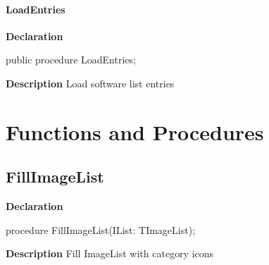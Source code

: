 \documentclass{report}
\newif\ifpdf
\begin{document}
\paragraph*{LoadEntries}\hspace*{\fill}

\label{manager.TMnFrm-LoadEntries}
\begin{list}{}{
\setlength{\itemindent}{0cm}
\setlength{\listparindent}{0cm}
\setlength{\leftmargin}{\evensidemargin}
\addtolength{\leftmargin}{\tmplength}
\settowidth{\labelsep}{X}
\addtolength{\leftmargin}{\labelsep}
\setlength{\labelwidth}{\tmplength}
}
\item[\textbf{Declaration}\hfill]
\ifpdf
\begin{flushleft}
\fi
\begin{ttfamily}
public procedure LoadEntries;\end{ttfamily}

\ifpdf
\end{flushleft}
\fi

\par
\item[\textbf{Description}]
Load software list entries

\end{list}
\section{Functions and Procedures}
\ifpdf
\subsection*{\large{\textbf{FillImageList}}\normalsize\hspace{1ex}\hrulefill}
\else
\subsection*{FillImageList}
\fi
\label{manager-FillImageList}
\begin{list}{}{
\setlength{\itemindent}{0cm}
\setlength{\listparindent}{0cm}
\setlength{\leftmargin}{\evensidemargin}
\addtolength{\leftmargin}{\tmplength}
\settowidth{\labelsep}{X}
\addtolength{\leftmargin}{\labelsep}
\setlength{\labelwidth}{\tmplength}
}
\item[\textbf{Declaration}\hfill]
\ifpdf
\begin{flushleft}
\fi
\begin{ttfamily}
procedure FillImageList(IList: TImageList);\end{ttfamily}

\ifpdf
\end{flushleft}
\fi

\par
\item[\textbf{Description}]
Fill ImageList with category icons

\end{list}
\end{document}
